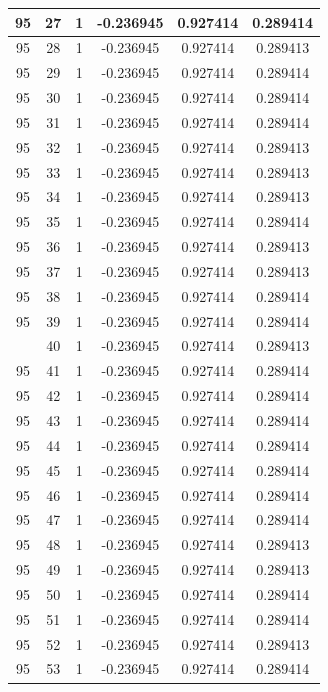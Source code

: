 \documentclass[12pt,a4paper]{article}
\numberwithin{equation}{section}
\numberwithin{figure}{section}
\numberwithin{table}{section}
\begin{document}
\begin{longtable}{|c|c|c|c|c|c|}
95 & 27 & 1 & -0.236945 & 0.927414 & 0.289414 \\ \hline
95 & 28 & 1 & -0.236945 & 0.927414 & 0.289413 \\ \hline
95 & 29 & 1 & -0.236945 & 0.927414 & 0.289414 \\ \hline
95 & 30 & 1 & -0.236945 & 0.927414 & 0.289414 \\ \hline
95 & 31 & 1 & -0.236945 & 0.927414 & 0.289414 \\ \hline
95 & 32 & 1 & -0.236945 & 0.927414 & 0.289413 \\ \hline
95 & 33 & 1 & -0.236945 & 0.927414 & 0.289413 \\ \hline
95 & 34 & 1 & -0.236945 & 0.927414 & 0.289413 \\ \hline
95 & 35 & 1 & -0.236945 & 0.927414 & 0.289414 \\ \hline
95 & 36 & 1 & -0.236945 & 0.927414 & 0.289413 \\ \hline
95 & 37 & 1 & -0.236945 & 0.927414 & 0.289413 \\ \hline
95 & 38 & 1 & -0.236945 & 0.927414 & 0.289414 \\ \hline
95 & 39 & 1 & -0.236945 & 0.927414 & 0.289414 \\ \hline
\pagebreak
95 & 40 & 1 & -0.236945 & 0.927414 & 0.289413 \\ \hline
95 & 41 & 1 & -0.236945 & 0.927414 & 0.289414 \\ \hline
95 & 42 & 1 & -0.236945 & 0.927414 & 0.289414 \\ \hline
95 & 43 & 1 & -0.236945 & 0.927414 & 0.289414 \\ \hline
95 & 44 & 1 & -0.236945 & 0.927414 & 0.289414 \\ \hline
95 & 45 & 1 & -0.236945 & 0.927414 & 0.289414 \\ \hline
95 & 46 & 1 & -0.236945 & 0.927414 & 0.289414 \\ \hline
95 & 47 & 1 & -0.236945 & 0.927414 & 0.289414 \\ \hline
95 & 48 & 1 & -0.236945 & 0.927414 & 0.289413 \\ \hline
95 & 49 & 1 & -0.236945 & 0.927414 & 0.289413 \\ \hline
95 & 50 & 1 & -0.236945 & 0.927414 & 0.289414 \\ \hline
95 & 51 & 1 & -0.236945 & 0.927414 & 0.289414 \\ \hline
95 & 52 & 1 & -0.236945 & 0.927414 & 0.289413 \\ \hline
95 & 53 & 1 & -0.236945 & 0.927414 & 0.289414 \\ \hline

\end{longtable}
\end{document}

